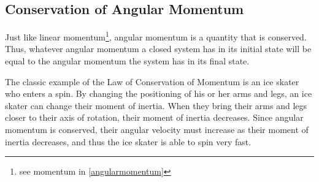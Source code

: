 	\subsection{Conservation of Angular Momentum}
 Just like linear momentum\footnote{see momentum in \cref{angularmomentum}}, angular momentum is a quantity that is conserved.  Thus, whatever angular momentum a closed system has in its initial state will be equal to the angular momentum the system has in its final state.  
 
 The classic example of the Law of Conservation of Momentum is an ice skater who enters a spin.  By changing the positioning of his or her arms and legs, an ice skater can change their moment of inertia.  When they bring their arms and legs closer to their axis of rotation, their moment of inertia decreases.  Since angular momentum is conserved, their angular velocity must increase as their moment of inertia decreases, and thus the ice skater is able to spin very fast. 
 
	
	

		


	


